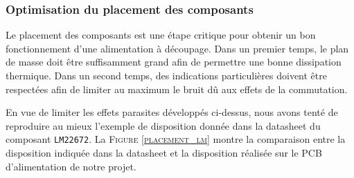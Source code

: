 				\vspace{-2em}
				
				\subsubsection{Optimisation du placement des composants}
				
				Le placement des composants est une étape critique pour
				obtenir un bon fonctionnement d'une alimentation à
				découpage. Dans un premier temps, le plan de masse 
				doit être suffisamment grand afin de permettre une bonne
				dissipation thermique. Dans un second temps, des indications
				particulières doivent être respectées afin de limiter
				au maximum le bruit dû aux effets de la commutation. 
				
				En vue de limiter les effets parasites développés ci-dessus,
				nous avons tenté de reproduire au mieux l'exemple de disposition
				donnée dans la datasheet du composant \texttt{LM22672}.
				La \textsc{Figure \ref{placement_lm}} montre la comparaison
				entre la disposition indiquée dans la datasheet et la disposition
				réalisée sur le PCB d'alimentation de notre projet.
				
